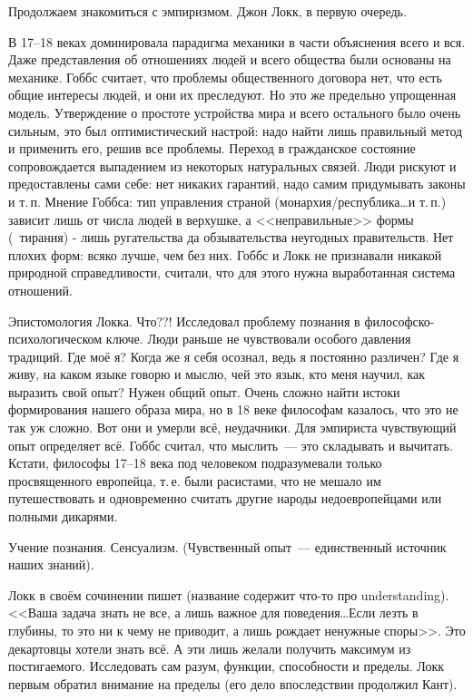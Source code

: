 Продолжаем знакомиться с эмпиризмом.
Джон Локк, в первую очередь.

В 17--18 веках доминировала парадигма механики в части объяснения всего и вся. Даже представления об отношениях людей и всего общества были основаны на механике. Гоббс считает, что проблемы общественного договора нет, что есть общие интересы людей, и они их преследуют. Но это же предельно упрощенная модель. Утверждение о простоте устройства мира и всего остального было очень сильным, это был оптимистический настрой: надо найти лишь правильный метод и применить его, решив все проблемы.
Переход в гражданское состояние сопровождается выпадением из некоторых натуральных связей. Люди рискуют и предоставлены сами себе: нет никаких гарантий, надо самим придумывать законы и т.\,п.
Мнение Гоббса: тип управления страной (монархия/республика\ldots и т.\,п.) зависит лишь от числа людей в верхушке, а <<неправильные>> формы (~тирания) - лишь ругательства да обзывательства неугодных правительств. Нет плохих форм: всяко лучше, чем без них.
Гоббс и Локк не признавали никакой природной справедливости, считали, что для этого нужна выработанная система отношений.

Эпистомология Локка. Что??!
Исследовал проблему познания в философско-психологическом ключе. Люди раньше не чувствовали особого давления традиций. Где моё я? Когда же я себя осознал, ведь я постоянно различен? Где я живу, на каком языке говорю и мыслю, чей это язык, кто меня научил, как выразить свой опыт? Нужен общий опыт. Очень сложно найти истоки формирования нашего образа мира, но в 18 веке философам казалось, что это не так уж сложно. Вот они и умерли всё, неудачники. Для эмпириста чувствующий опыт определяет всё. Гоббс считал, что мыслить~--- это складывать и вычитать. Кстати, философы 17--18 века под человеком подразумевали только просвященного европейца, т.\,е. были расистами, что не мешало им путешествовать и одновременно считать другие народы недоевропейцами или полными дикарями.

Учение познания. Сенсуализм. (Чувственный опыт~--- единственный источник наших знаний). 

Локк в своём сочинении пишет (название содержит что-то про understanding). <<Ваша задача знать не все, а лишь важное для поведения\ldots Если лезть в глубины, то это ни к чему не приводит, а лишь рождает ненужные споры>>. Это декартовцы хотели знать всё. А эти лишь желали получить максимум из постигаемого. Исследовать сам разум, функции, способности и пределы. Локк первым обратил внимание на пределы (его дело впоследствии продолжил Кант). 

